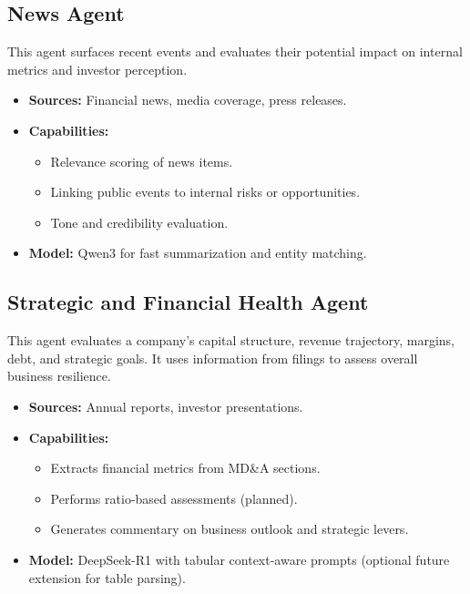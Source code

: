 \documentclass[11pt]{article}
\begin{document}
\subsection*{News Agent}
This agent surfaces recent events and evaluates their potential impact on internal metrics and investor perception.
\begin{itemize}
    \item \textbf{Sources:} Financial news, media coverage, press releases.
    \item \textbf{Capabilities:}
        \begin{itemize}
            \item Relevance scoring of news items.
            \item Linking public events to internal risks or opportunities.
            \item Tone and credibility evaluation.
        \end{itemize}
    \item \textbf{Model:} Qwen3 for fast summarization and entity matching.
\end{itemize}

\subsection*{Strategic and Financial Health Agent}
This agent evaluates a company's capital structure, revenue trajectory, margins, debt, and strategic goals. It uses information from filings to assess overall business resilience.
\begin{itemize}
    \item \textbf{Sources:} Annual reports, investor presentations.
    \item \textbf{Capabilities:}
        \begin{itemize}
            \item Extracts financial metrics from MD\&A sections.
            \item Performs ratio-based assessments (planned).
            \item Generates commentary on business outlook and strategic levers.
        \end{itemize}
    \item \textbf{Model:} DeepSeek-R1 with tabular context-aware prompts (optional future extension for table parsing).
\end{itemize}
\end{document}
